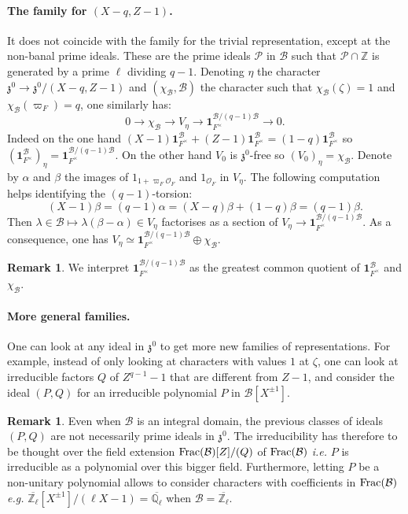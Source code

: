 \documentclass[11pt]{article}
\theoremstyle{plain}
\theoremstyle{definition}
\newtheorem{rem}[theo]{Remark}
\theoremstyle{plain}
\theoremstyle{definition}
\theoremstyle{plain}
\begin{document}
\paragraph{The family for $(X-q,Z-1)$.} It does not coincide with the family for the trivial representation, except at the non-banal prime ideals. These are the prime ideals $\mathcal{P}$ in $\mathcal{B}$ such that $\mathcal{P} \cap \mathbb{Z}$ is generated by a prime $\ell$ dividing $q-1$. Denoting $\eta$ the character $\mathfrak{z}^0 \to \mathfrak{z}^0/(X-q,Z-1)$ and $(\chi_\mathcal{B},\mathcal{B})$ the character such that $\chi_\mathcal{B}(\zeta) = 1$ and $\chi_\mathcal{B}(\varpi_F)=q$, one similarly has:
$$0 \to \chi_\mathcal{B} \to V_{\eta} \to \textbf{1}_{F^\times}^{\mathcal{B}/(q-1)\mathcal{B}} \to 0.$$
Indeed on the one hand $(X-1) \textbf{1}_{F^\times}^\mathcal{B} + (Z-1) \textbf{1}_{F^\times}^\mathcal{B} = (1-q) \textbf{1}_{F^\times}^\mathcal{B}$ so $(\textbf{1}_{F^\times}^\mathcal{B})_\eta = \textbf{1}_{F^\times}^{\mathcal{B} / (q-1) \mathcal{B}}$. On the other hand $V_0$ is $\mathfrak{z}^0$-free so $(V_0)_\eta = \chi_\mathcal{B}$. Denote by $\alpha$ and $\beta$ the images of $1_{1+\varpi_F \mathcal{O}_F}$ and $1_{\mathcal{O}_F}$ in $V_\eta$. The following computation helps identifying the $(q-1)$-torsion:
$$(X-1) \beta = (q-1) \alpha = (X-q) \beta + (1-q) \beta = (q-1)\beta.$$
Then $\lambda \in \mathcal{B} \mapsto \lambda (\beta - \alpha) \in V_\eta$ factorises as a section of $V_\eta \to \textbf{1}_{F^\times}^{\mathcal{B}/(q-1)\mathcal{B}}$. As a consequence, one has $V_\eta \simeq \textbf{1}_{F^\times}^{\mathcal{B}/(q-1)\mathcal{B}} \oplus \chi_\mathcal{B}$. 

\begin{rem} We interpret $\textbf{1}_{F^\times}^{\mathcal{B}/(q-1)\mathcal{B}}$ as the greatest common quotient of $\textbf{1}_{F^\times}^\mathcal{B}$ and $\chi_\mathcal{B}$. \end{rem}

\paragraph{More general families.} One can look at any ideal in $\mathfrak{z}^0$ to get more new families of representations. For example, instead of only looking at characters with values $1$ at $\zeta$, one can look at irreducible factors $Q$ of $Z^{q-1}-1$ that are different from $Z-1$, and consider the ideal $(P,Q)$ for an irreducible polynomial $P$ in $\mathcal{B}[X^{\pm 1}]$.

\begin{rem} Even when $\mathcal{B}$ is an integral domain, the previous classes of ideals $(P,Q)$ are not necessarily prime ideals in $\mathfrak{z}^0$. The irreducibility has therefore to be thought over the field extension $\textup{Frac}(\mathcal{B}) [Z] / (Q)$ of $\textup{Frac}(\mathcal{B})$ \textit{i.e.} $P$ is irreducible as a polynomial over this bigger field. Furthermore, letting $P$  be a non-unitary polynomial allows to consider characters with coefficients in $\textup{Frac}(\mathcal{B})$ \textit{e.g.} $\overline{\mathbb{Z}_\ell}[X^{\pm 1}] / (\ell X -1) = \overline{\mathbb{Q}_\ell}$ when $\mathcal{B}=\overline{\mathbb{Z}_\ell}$. \end{rem}
\end{document}
